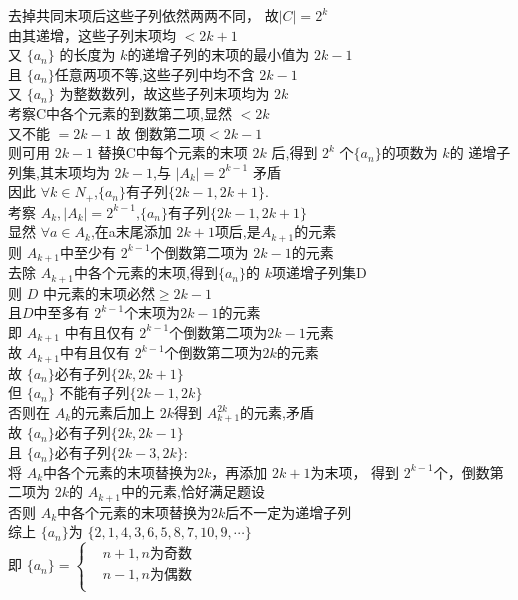 \documentclass[class=ctexart,crop=false]{standalone}
\begin{document}
\begin{enumerate}[label=(\Roman*)]
        去掉共同末项后这些子列依然两两不同， 故$|C|=2^k$\\
        由其递增，这些子列末项均 $<2k+1$ \\
        又 $\{a_n\} $ 的长度为 $k$的递增子列的末项的最小值为 $2k-1$\\
        且 $\{a_n\} $任意两项不等,这些子列中均不含 $2k-1$\\
        又 $\{a_n\} $ 为整数数列，故这些子列末项均为 $2k$\\
        考察C中各个元素的到数第二项,显然 $<2k$\\
        又不能 $=2k-1$ 故 倒数第二项$<2k-1$\\
        则可用 $2k-1$ 替换C中每个元素的末项 $2k$ 后,得到 $2^k$ 个$
        \{a_n\} $的项数为 $k$的 递增子列集,其末项均为 $2k-1$,与 $|A_{k}|=2^{k-1}$ 矛盾\\
        因此 $ \forall k \in N_+$,$\{a_n\}$有子列$\{2k-1,2k+1\}.$\\
        考察 $A_k,|A_{k}|=2^{k-1}$,$\{a_n\}$有子列$\{2k-1,2k+1\}$\\
        显然 $\forall a \in A_k$,在a末尾添加 $2k+1$项后,是$A_{k+1}$的元素\\
        则 $A_{k+1}$中至少有 $2^{k-1}$个倒数第二项为 $2k-1$的元素\\
        去除 $A_{k+1}$中各个元素的末项,得到$\{a_n\} $的 $k$项递增子列集D\\
        则 $D$ 中元素的末项必然$\geqslant 2k-1$\\
        且$D$中至多有 $2^{k-1}$个末项为$2k-1$的元素\\
        即 $A_{k+1}$ 中有且仅有 $2^{k-1}$个倒数第二项为$2k-1$元素\\
        故 $A_{k+1}$中有且仅有 $2^{k-1}$个倒数第二项为$2k$的元素\\
        故 $\{a_n\} $必有子列$\{2k,2k+1\}$\\
        但 $\{a_n\} $ 不能有子列$\{2k-1,2k\}$\\
        否则在 $A_k$的元素后加上 $2k$得到 $A_{k+1}^{2k}$的元素,矛盾\\
        故 $\{a_n\} $必有子列$\{2k,2k-1\}$\\
        且 $\{a_n\} $必有子列$\{2k-3,2k\}$:\\
        将 $A_k$中各个元素的末项替换为$2k$，再添加 $2k+1$为末项，
        得到 $2^{k-1}$个，倒数第二项为 $2k$的 $A_{k+1}$中的元素,恰好满足题设\\
        否则 $A_k$中各个元素的末项替换为$2k$后不一定为递增子列\\
        综上 $\{a_n\} $为 $\{2,1,4,3,6,5,8,7,10,9,\cdots \}$\\
        即 $\{a_n\} =\left\{\begin{aligned}
         &n+1 ,n \text{为奇数} \\ 
         &n-1,n \text{为偶数} \\ 
        \end{aligned}\right.$\par
    
    \end{enumerate}
\end{document}
